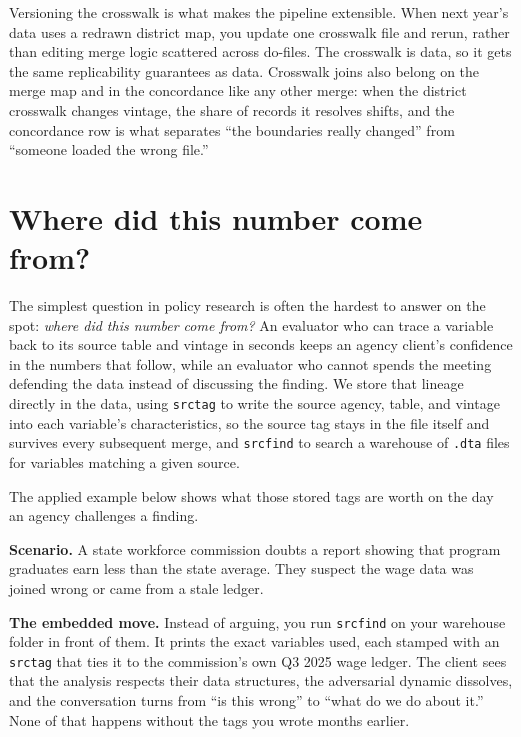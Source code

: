 \documentclass[
    a4paper,
    fontsize=10pt,
    twoside=true,
    numbers=noenddot,
]{kaobook}
\newcounter{appliedexample}
\newenvironment{appliedexample}[1][]{%
    \refstepcounter{appliedexample}%
    \begin{appliedexamplebox}[frametitle={Applied Example~\theappliedexample.~~#1}]%
}{%
    \end{appliedexamplebox}%
}
\begin{document}
Versioning the crosswalk is what makes the pipeline extensible. When next year's data uses a redrawn district map, you update one crosswalk file and rerun, rather than editing merge logic scattered across do-files. The crosswalk is data, so it gets the same replicability guarantees as data. Crosswalk joins also belong on the merge map and in the concordance like any other merge: when the district crosswalk changes vintage, the share of records it resolves shifts, and the concordance row is what separates \enquote{the boundaries really changed} from \enquote{someone loaded the wrong file.}

\section{Where did this number come from?}\label{sec:lineage}
The simplest question in policy research is often the hardest to answer on the spot: \emph{where did this number come from?} An evaluator who can trace a variable back to its source table and vintage in seconds keeps an agency client's confidence in the numbers that follow, while an evaluator who cannot spends the meeting defending the data instead of discussing the finding. We store that lineage directly in the data, using \texttt{srctag} to write the source agency, table, and vintage into each variable's characteristics, so the source tag stays in the file itself and survives every subsequent merge, and \texttt{srcfind} to search a warehouse of \texttt{.dta} files for variables matching a given source.

The applied example below shows what those stored tags are worth on the day an agency challenges a finding.

\begin{appliedexample}[Proving lineage to a skeptical agency]\label{ae:ch06-lineage}
\textbf{Scenario.} A state workforce commission doubts a report showing that program graduates earn less than the state average. They suspect the wage data was joined wrong or came from a stale ledger.

\medskip
\textbf{The embedded move.} Instead of arguing, you run \texttt{srcfind} on your warehouse folder in front of them. It prints the exact variables used, each stamped with an \texttt{srctag} that ties it to the commission's own Q3 2025 wage ledger. The client sees that the analysis respects their data structures, the adversarial dynamic dissolves, and the conversation turns from \enquote{is this wrong} to \enquote{what do we do about it.} None of that happens without the tags you wrote months earlier.
\end{appliedexample}
\end{document}
